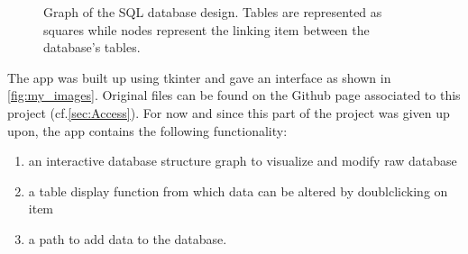 \documentclass{article}
\begin{document}
\begin{figure}[htbp]
  \caption{Graph of the SQL database design. Tables are represented as squares
    while nodes represent the linking item between the database's tables.}
  \label{fig:database}
\end{figure}

\noindent The app was built up using tkinter and gave an interface as shown in
\autoref{fig:my_images}. Original files can be found on the Github page
associated to this project (cf.\autoref{sec:Access}). For now and since this
part of the project was given up upon, the app contains the following
functionality:
\begin{enumerate}[label=\textbf{\roman*.}]
  \item an interactive database structure graph to visualize and modify raw
        database
  \item a table display function from which data can be altered by
        doublclicking on item
  \item a path to add data to the database.
\end{enumerate}
\end{document}
